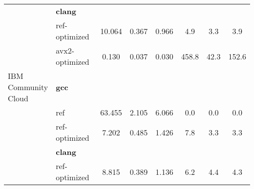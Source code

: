 \begin{table}
\begin{tabularx}{\linewidth}{l l c c c c c c}
          & \textbf{clang} & & & & & \\
          & ref-optimized & 10.064 & 0.367 & 0.966 & 4.9 & 3.3 & 3.9\\
          & avx2-optimized & 0.130 & 0.037 & 0.030 & 458.8 & 42.3 & 152.6\\
          \midrule
          \multirowcell{5}{IBM\\ Community\\ Cloud}
          & \textbf{gcc} & & & & & \\
          & ref & 63.455 & 2.105 & 6.066 & 0.0 & 0.0 & 0.0\\
          & ref-optimized & 7.202 & 0.485 & 1.426 & 7.8 & 3.3 & 3.3\\
          & \textbf{clang} & & & & & \\
          & ref-optimized & 8.815 & 0.389 & 1.136 & 6.2 & 4.4 & 4.3\\
        \bottomrule
    \end{tabularx}
\end{table}